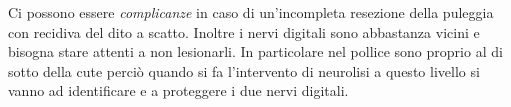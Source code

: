 Ci possono essere \emph{\emph{complicanze}} in caso di un'incompleta resezione della puleggia con recidiva del dito a scatto. Inoltre i nervi
digitali sono abbastanza vicini e bisogna stare attenti a non lesionarli. In particolare nel pollice sono proprio al di sotto della cute perciò quando si fa l'intervento di neurolisi a questo livello si
vanno ad identificare e a proteggere i due nervi digitali.
